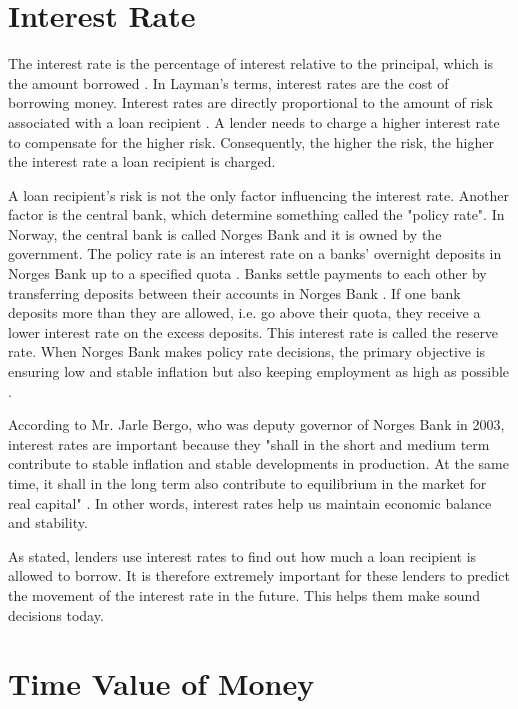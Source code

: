 
\section{Interest Rate}

\noindent The interest rate is the percentage of interest relative to the principal, which is the amount borrowed \cite{investopedia_interest_rate_new}. In Layman's terms, interest rates are the cost of borrowing money. Interest rates are directly proportional to the amount of risk associated with a loan recipient \cite{cfi_interest_rate}. A lender needs to charge a higher interest rate to compensate for the higher risk. Consequently, the higher the risk, the higher the interest rate a loan recipient is charged.

A loan recipient's risk is not the only factor influencing the interest rate. Another factor is the central bank, which determine something called the "policy rate". In Norway, the central bank is called Norges Bank and it is owned by the government. The policy rate is an interest rate on a banks' overnight deposits in Norges Bank up to a specified quota \cite{norges_bank_policy_rate}. Banks settle payments to each other by transferring deposits between their accounts in Norges Bank \cite{norges_bank_how_policy_rate_influence}. If one bank deposits more than they are allowed, i.e. go above their quota, they receive a lower interest rate on the excess deposits. This interest rate is called the reserve rate. When Norges Bank makes policy rate decisions, the primary objective is ensuring low and stable inflation but also keeping employment as high as possible \cite{norges_bank_policy_rate}.

According to Mr. Jarle Bergo, who was deputy governor of Norges Bank in 2003, interest rates are important because they "shall in the short and medium term contribute to stable inflation and stable developments in production. At the same time, it shall in the long term also contribute to equilibrium in the market for real capital" \cite{norges_bank_role_of_interest_rates}. In other words, interest rates help us maintain economic balance and stability.

As stated, lenders use interest rates to find out how much a loan recipient is allowed to borrow. It is therefore extremely important for these lenders to predict the movement of the interest rate in the future. This helps them make sound decisions today.

\newpage

\section{Time Value of Money}

